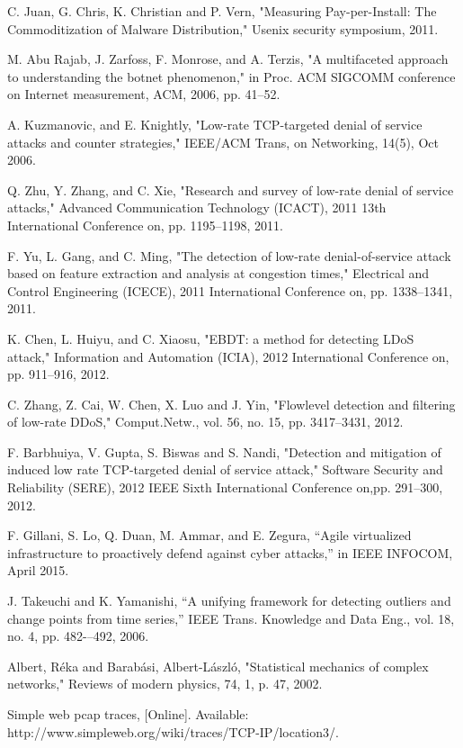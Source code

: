 \begin{thebibliography}{99}
C. Juan, G. Chris, K. Christian and P. Vern,
"Measuring Pay-per-Install: The Commoditization of Malware Distribution,"
Usenix security symposium, 2011.

M. Abu Rajab, J. Zarfoss, F. Monrose, and A. Terzis,
"A multifaceted approach to understanding the botnet phenomenon,"
in Proc. ACM SIGCOMM conference on Internet measurement,
ACM, 2006, pp. 41--52.

A. Kuzmanovic, and E. Knightly,
"Low-rate TCP-targeted denial of service attacks and counter strategies,"
IEEE/ACM Trans, on Networking, 14(5), Oct 2006.

Q. Zhu, Y. Zhang, and C. Xie,
"Research and survey of low-rate denial of service attacks,"
Advanced Communication Technology (ICACT), 2011 13th International Conference on,
pp. 1195--1198, 2011.

F. Yu, L. Gang, and C. Ming,
"The detection of low-rate denial-of-service attack based on feature extraction and analysis at congestion times,"
Electrical and Control Engineering (ICECE), 2011 International Conference on,
pp. 1338--1341, 2011.

K. Chen, L. Huiyu, and C. Xiaosu,
"EBDT: a method for detecting LDoS attack,"
Information and Automation (ICIA), 2012 International Conference on,
pp. 911--916, 2012.

C. Zhang, Z. Cai, W. Chen, X. Luo and J. Yin,
"Flowlevel detection and filtering of low-rate DDoS,"
Comput.Netw., vol. 56, no. 15, pp. 3417--3431, 2012.

F. Barbhuiya, V. Gupta, S. Biswas and S. Nandi,
"Detection and mitigation of induced low rate TCP-targeted denial of service attack,"
Software Security and Reliability (SERE), 2012 IEEE Sixth International Conference on,pp. 291--300, 2012.

F. Gillani, S. Lo, Q. Duan, M. Ammar, and E. Zegura,
“Agile virtualized infrastructure to proactively defend against cyber attacks,”
in IEEE INFOCOM,
April 2015.

J. Takeuchi and K. Yamanishi,
“A unifying framework for detecting outliers and change points from time series,”
IEEE Trans. Knowledge and Data Eng.,
vol. 18, no. 4, pp. 482-–492, 2006.


Albert, R{\'e}ka and Barab{\'a}si, Albert-L{\'a}szl{\'o},
"Statistical mechanics of complex networks,"
Reviews of modern physics, 74, 1, p. 47, 2002.


Simple web pcap traces, [Online]. Available: http://www.simpleweb.org/wiki/traces/TCP-IP/location3/.

\end{thebibliography}
